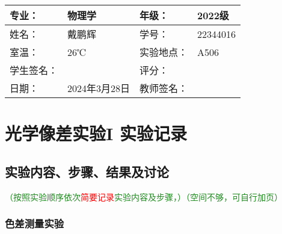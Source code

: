 \documentclass[dvipsnames, svgnames,a4paper,11pt]{article}
\begin{document}
\clearpage
\begin{table}
	\renewcommand\arraystretch{1.7}
	\centering
	\begin{tabularx}{\textwidth}{|X|X|X|X|}
	\hline
	专业：& 物理学 &年级：& 2022级 \\
	\hline
	姓名：& 戴鹏辉 & 学号：& 22344016 \\
	\hline
	室温：& 26℃ & 实验地点： & A506	\\
	\hline
	学生签名：& & 评分： &\\
	\hline
	日期：& 2024年3月28日  & 教师签名：&\\
	\hline
	\end{tabularx}
\end{table}

\section{光学像差实验I \quad\heiti 实验记录}
\subsection{实验内容、步骤、结果及讨论}\textcolor{ForestGreen}{（按照实验顺序依次}\textcolor{red}{简要记录}\textcolor{ForestGreen}{实验内容及步骤，）（空间不够，可自行加页）}

\subsubsection{色差测量实验}
\end{document}
